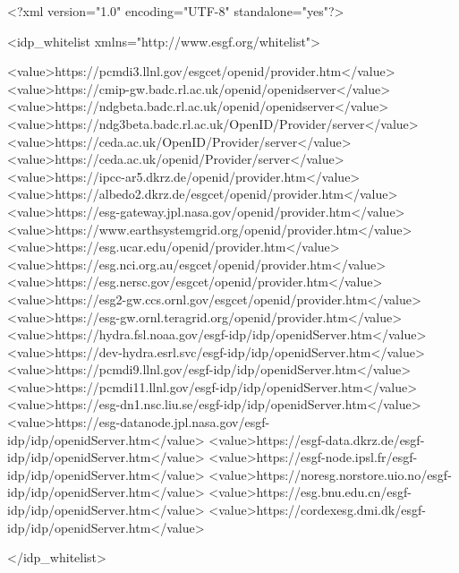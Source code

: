 \begin{small}
\begin{verbatimtab}[4]

<?xml version="1.0" encoding="UTF-8" standalone="yes"?>

<idp_whitelist xmlns="http://www.esgf.org/whitelist">

	<value>https://pcmdi3.llnl.gov/esgcet/openid/provider.htm</value>
	<value>https://cmip-gw.badc.rl.ac.uk/openid/openidserver</value>
	<value>https://ndgbeta.badc.rl.ac.uk/openid/openidserver</value>
	<value>https://ndg3beta.badc.rl.ac.uk/OpenID/Provider/server</value>
	<value>https://ceda.ac.uk/OpenID/Provider/server</value>
	<value>https://ceda.ac.uk/openid/Provider/server</value>
	<value>https://ipcc-ar5.dkrz.de/openid/provider.htm</value>
	<value>https://albedo2.dkrz.de/esgcet/openid/provider.htm</value>
	<value>https://esg-gateway.jpl.nasa.gov/openid/provider.htm</value>
	<value>https://www.earthsystemgrid.org/openid/provider.htm</value>
	<value>https://esg.ucar.edu/openid/provider.htm</value>
	<value>https://esg.nci.org.au/esgcet/openid/provider.htm</value>
	<value>https://esg.nersc.gov/esgcet/openid/provider.htm</value>
	<value>https://esg2-gw.ccs.ornl.gov/esgcet/openid/provider.htm</value>
	<value>https://esg-gw.ornl.teragrid.org/openid/provider.htm</value>
    <value>https://hydra.fsl.noaa.gov/esgf-idp/idp/openidServer.htm</value>
    <value>https://dev-hydra.esrl.svc/esgf-idp/idp/openidServer.htm</value>
    <value>https://pcmdi9.llnl.gov/esgf-idp/idp/openidServer.htm</value>
    <value>https://pcmdi11.llnl.gov/esgf-idp/idp/openidServer.htm</value>
    <value>https://esg-dn1.nsc.liu.se/esgf-idp/idp/openidServer.htm</value>
    <value>https://esg-datanode.jpl.nasa.gov/esgf-idp/idp/openidServer.htm</value>
    <value>https://esgf-data.dkrz.de/esgf-idp/idp/openidServer.htm</value>
    <value>https://esgf-node.ipsl.fr/esgf-idp/idp/openidServer.htm</value>
    <value>https://noresg.norstore.uio.no/esgf-idp/idp/openidServer.htm</value>
	<value>https://esg.bnu.edu.cn/esgf-idp/idp/openidServer.htm</value>
	<value>https://cordexesg.dmi.dk/esgf-idp/idp/openidServer.htm</value>

</idp_whitelist>
\end{verbatimtab}
\end{small}

